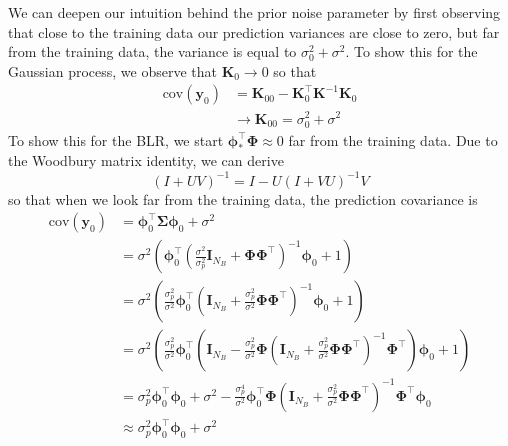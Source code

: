 \documentclass{article}
\begin{document}
We can deepen our intuition behind the prior noise parameter by first observing that close to the training data our prediction variances are close to zero, but far from the training data, the variance is equal to $\sigma_0^2+\sigma^2$. To show this for the Gaussian process, we observe that $\mathbf{K}_0\rightarrow 0$ so that
\begin{equation}
\begin{split}
     \text{cov}(\mathbf{y}_0) &=\mathbf{K}_{00} - \mathbf{K}_0^\top \mathbf{K}^{-1} \mathbf{K}_0 \\
     &\rightarrow\mathbf{K}_{00} = \sigma_0^2+\sigma^2
     \end{split}
\end{equation}
To show this for the BLR, we start $\boldsymbol{\phi}_\ast^\top\boldsymbol{\Phi}\approx 0$ far from the training data. Due to the Woodbury matrix identity, we can derive
\begin{equation}
    \left(I + UV \right)^{-1} = I -U \left(I + VU \right)^{-1} V
\end{equation}so that when we look far from the training data, the prediction covariance is
\begin{equation}
\begin{split}
\text{cov}(\mathbf{y}_0)&=\boldsymbol{\phi}_0^\top\boldsymbol{\Sigma}\boldsymbol{\phi}_0 + \sigma^2  \\ 
&=  \sigma^2\left( \boldsymbol{\phi}_0^\top\left(\frac{\sigma^2}{\sigma_p^2}\mathbf{I}_{N_B}+\boldsymbol{\Phi}\boldsymbol{\Phi}^\top\right)^{-1}\boldsymbol{\phi}_0+1\right) \\
&= \sigma^2\left( \frac{\sigma_p^2}{\sigma^2}\boldsymbol{\phi}_0^\top\left(\mathbf{I}_{N_B}+\frac{\sigma_p^2}{\sigma^2}\boldsymbol{\Phi}\boldsymbol{\Phi}^\top\right)^{-1}\boldsymbol{\phi}_0+1\right) \\
&= \sigma^2\left( \frac{\sigma_p^2}{\sigma^2}\boldsymbol{\phi}_0^\top\left(\mathbf{I}_{N_B}-\frac{\sigma_p^2}{\sigma^2}\boldsymbol{\Phi}\left(\mathbf{I}_{N_B}+\frac{\sigma_p^2}{\sigma^2}\boldsymbol{\Phi}\boldsymbol{\Phi}^\top\right)^{-1}\boldsymbol{\Phi}^\top\right)\boldsymbol{\phi}_0+1\right) \\
&= \sigma_p^2\boldsymbol{\phi}_0^\top\boldsymbol{\phi}_0 + \sigma^2 -\frac{\sigma_p^4}{\sigma^2}\boldsymbol{\phi}_0^\top\boldsymbol{\Phi}\left(\mathbf{I}_{N_B}+\frac{\sigma_p^2}{\sigma^2}\boldsymbol{\Phi}\boldsymbol{\Phi}^\top\right)^{-1}\boldsymbol{\Phi}^\top\boldsymbol{\phi}_0 \\
&\approx\sigma_p^2\boldsymbol{\phi}_0^\top\boldsymbol{\phi}_0 + \sigma^2
\end{split}
\end{equation} 
\end{document}
